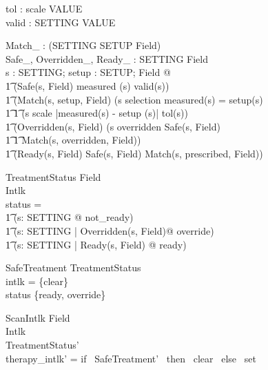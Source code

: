 \begin{axdef}
tol : scale \fun VALUE \\
valid : SETTING \fun \power VALUE
\end{axdef}

\begin{axdef}
Match\_ : \power(SETTING \cross SETUP \cross Field) \\
Safe\_, Overridden\_, Ready\_ : SETTING \rel Field \\
\ST \forall s : SETTING; setup : SETUP; Field @ \\
\t1 (Safe(s, \theta Field) \iff measured (s) \in valid(s)) \land\\
\t1 (Match(s, setup, \theta Field) \iff (s \in selection \land
measured(s) = setup(s) \lor \\
\t1 \t1 (s \in scale \land |measured(s) - setup (s)| \leq
tol(s))\land \\
\t1 (Overridden(s, \theta Field) \iff (s \in \dom overridden \land
Safe(s, \theta Field) \land \\
\t1 \t1 Match(s, overridden, \theta Field)) \land \\
\t1 (Ready(s, \theta Field) \iff Safe(s, \theta Field) \land
Match(s, prescribed, \theta Field))
\end{axdef}

\begin{schema}{TreatmentStatus}
Field \\
Intlk \\
\ST status = \\
\t1 (\lambda s: SETTING @ not\_ready) \oplus \\
\t1 (\lambda s: SETTING | Overridden(s, \theta Field)@ override)
\oplus \\
\t1 (\lambda s: SETTING | Ready(s, \theta Field) @ ready)
\end{schema}

\begin{schema}{SafeTreatment}
TreatmentStatus \\
\ST \ran intlk = \{clear\} \\
\ran status \subseteq \{ready, override\}
\end{schema}

\begin{schema}{ScanIntlk}
\Xi Field \\
\Delta Intlk \\
\ST TreatmentStatus' \\
therapy\_intlk' = if \, SafeTreatment' \, then \, clear \, else \,
set
\end{schema}


